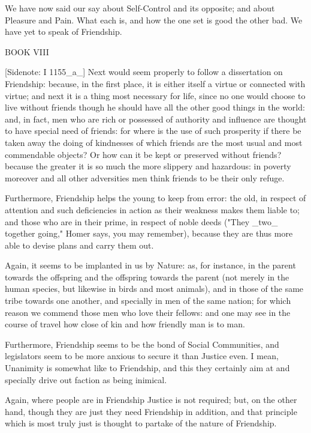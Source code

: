We have now said our say about Self-Control and its opposite; and about
Pleasure and Pain. What each is, and how the one set is good the other
bad. We have yet to speak of Friendship.




BOOK VIII

[Sidenote: I 1155_a_] Next would seem properly to follow a dissertation
on Friendship: because, in the first place, it is either itself a virtue
or connected with virtue; and next it is a thing most necessary for
life, since no one would choose to live without friends though he should
have all the other good things in the world: and, in fact, men who are
rich or possessed of authority and influence are thought to have special
need of friends: for where is the use of such prosperity if there be
taken away the doing of kindnesses of which friends are the most usual
and most commendable objects? Or how can it be kept or preserved without
friends? because the greater it is so much the more slippery and
hazardous: in poverty moreover and all other adversities men think
friends to be their only refuge.

Furthermore, Friendship helps the young to keep from error: the old, in
respect of attention and such deficiencies in action as their weakness
makes them liable to; and those who are in their prime, in respect of
noble deeds ("They _two_ together going," Homer says, you may remember),
because they are thus more able to devise plans and carry them out.

Again, it seems to be implanted in us by Nature: as, for instance, in
the parent towards the offspring and the offspring towards the parent
(not merely in the human species, but likewise in birds and most
animals), and in those of the same tribe towards one another, and
specially in men of the same nation; for which reason we commend those
men who love their fellows: and one may see in the course of travel how
close of kin and how friendly man is to man.

Furthermore, Friendship seems to be the bond of Social Communities, and
legislators seem to be more anxious to secure it than Justice even. I
mean, Unanimity is somewhat like to Friendship, and this they certainly
aim at and specially drive out faction as being inimical.

Again, where people are in Friendship Justice is not required; but, on
the other hand, though they are just they need Friendship in addition,
and that principle which is most truly just is thought to partake of the
nature of Friendship.

